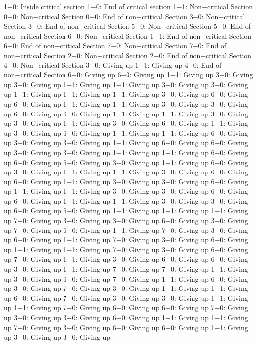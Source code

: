 1−0: Inside critical section
1−0: End of critical section
1−1: Non−critical Section
0−0: Non−critical Section
0−0: End of non−critical Section
3−0: Non−critical Section
3−0: End of non−critical Section
5−0: Non−critical Section
5−0: End of non−critical Section
6−0: Non−critical Section
1−1: End of non−critical Section
6−0: End of non−critical Section
7−0: Non−critical Section
7−0: End of non−critical Section
2−0: Non−critical Section
2−0: End of non−critical Section
4−0: Non−critical Section
3−0: Giving up
1−1: Giving up
4−0: End of non−critical Section
6−0: Giving up
6−0: Giving up
1−1: Giving up
3−0: Giving up
3−0: Giving up
1−1: Giving up
1−1: Giving up
3−0: Giving up
3−0: Giving up
1−1: Giving up
1−1: Giving up
1−1: Giving up
3−0: Giving up
6−0: Giving up
6−0: Giving up
1−1: Giving up
1−1: Giving up
3−0: Giving up
3−0: Giving up
6−0: Giving up
6−0: Giving up
1−1: Giving up
1−1: Giving up
3−0: Giving up
3−0: Giving up
1−1: Giving up
3−0: Giving up
6−0: Giving up
1−1: Giving up
3−0: Giving up
6−0: Giving up
1−1: Giving up
1−1: Giving up
6−0: Giving up
3−0: Giving up
3−0: Giving up
1−1: Giving up
6−0: Giving up
6−0: Giving up
3−0: Giving up
3−0: Giving up
1−1: Giving up
1−1: Giving up
6−0: Giving up
6−0: Giving up
6−0: Giving up
3−0: Giving up
1−1: Giving up
6−0: Giving up
3−0: Giving up
1−1: Giving up
1−1: Giving up
3−0: Giving up
6−0: Giving up
6−0: Giving up
1−1: Giving up
3−0: Giving up
3−0: Giving up
6−0: Giving up
1−1: Giving up
1−1: Giving up
3−0: Giving up
3−0: Giving up
6−0: Giving up
6−0: Giving up
1−1: Giving up
1−1: Giving up
3−0: Giving up
3−0: Giving up
6−0: Giving up
6−0: Giving up
1−1: Giving up
1−1: Giving up
1−1: Giving up
7−0: Giving up
3−0: Giving up
3−0: Giving up
6−0: Giving up
3−0: Giving up
7−0: Giving up
6−0: Giving up
1−1: Giving up
7−0: Giving up
3−0: Giving up
6−0: Giving up
1−1: Giving up
7−0: Giving up
3−0: Giving up
6−0: Giving up
1−1: Giving up
1−1: Giving up
7−0: Giving up
3−0: Giving up
6−0: Giving up
7−0: Giving up
1−1: Giving up
3−0: Giving up
6−0: Giving up
6−0: Giving up
3−0: Giving up
1−1: Giving up
7−0: Giving up
7−0: Giving up
1−1: Giving up
3−0: Giving up
6−0: Giving up
7−0: Giving up
1−1: Giving up
6−0: Giving up
3−0: Giving up
7−0: Giving up
3−0: Giving up
1−1: Giving up
1−1: Giving up
6−0: Giving up
7−0: Giving up
3−0: Giving up
3−0: Giving up
1−1: Giving up
1−1: Giving up
7−0: Giving up
6−0: Giving up
6−0: Giving up
7−0: Giving up
3−0: Giving up
3−0: Giving up
6−0: Giving up
1−1: Giving up
1−1: Giving up
7−0: Giving up
3−0: Giving up
6−0: Giving up
6−0: Giving up
1−1: Giving up
3−0: Giving up
3−0: Giving up
